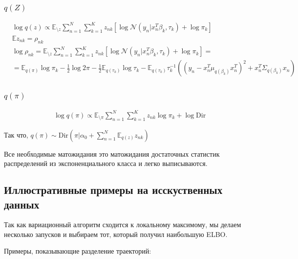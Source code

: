 \subsubsection*{$q(Z)$}

\begin{equation*}
\begin{aligned}
& \log q(z) \propto \mathbb{E}_{\setminus z}\sum\limits_{n=1}^N\sum\limits_{k=1}^K z_{nk}\left[\log\mathcal{N}(y_n|x_n^T\beta_k, \tau_k) + \log \pi_k\right] \\
& \mathbb{E}z_{nk} = \rho_{nk} \\
& \log\rho_{nk} = \mathbb{E}_{\setminus z}\sum\limits_{n=1}^N\sum\limits_{k=1}^K z_{nk}\left[\log\mathcal{N}(y_n|x_n^T\beta_k, \tau_k) + \log \pi_k\right] = \\
& = \mathbb{E}_{q(\pi)}\log\pi_k - \frac{1}{2}\log 2\pi - \frac{1}{2}\mathbb{E}_{q(\tau_k)}\log\tau_k - \mathbb{E}_{q(\tau_k)}\tau_k^{-1}\left((y_n-x_n^T\mu_{q(\beta_k)}x_n^T)^2 + x_n^T\Sigma_{q(\beta_k)}x_n\right)
 \end{aligned} 
 \end{equation*}

\subsubsection*{$q(\pi)$}
\begin{equation*}
\begin{aligned}
& \log q(\pi) \propto \mathbb{E}_{\setminus \pi}\sum\limits_{n=1}^N\sum\limits_{k=1}^K z_{nk} \log\pi_k + \log \text{Dir}
 \end{aligned} 
 \end{equation*}

Так что, $q(\pi)\sim\text{Dir}(\pi|\alpha_0 + \sum\limits_{n=1}^N\mathbb{E}_{q(z)}z_{nk})$

Все необходимые матожидания это матожидания достаточных статистик распределений из экспоненциального класса и легко выписываются.
\newpage

\subsection{Иллюстративные примеры на исскуственных данных }
Так как вариационный алгоритм сходится к локальному максимому, мы делаем несколько запусков и выбираем тот, который получил наибольшую ELBO.

Примеры, показывающие разделение траекторий:

